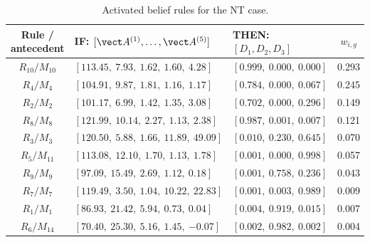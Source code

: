 \begin{table}[!t]
  \centering
  \caption{Activated belief rules for the NT case.}
  \label{tab:ja-if-then-rules}
  \scriptsize
  \setlength{\tabcolsep}{2.0pt}
  \renewcommand{\arraystretch}{1.10}
  \begin{tabularx}{\columnwidth}{@{}c>{\centering\arraybackslash}Xlc@{}}
    \toprule
    Rule / antecedent & IF: $[\vect A^{(1)},\ldots,\vect A^{(5)}]$ & THEN: $[D_1,D_2,D_3]$ & $w_{i,g}$ \\
    \midrule
    $R_{10}/M_{10}$ & $[113.45,\ 7.93,\ 1.62,\ 1.60,\ 4.28]$  & $[0.999,\ 0.000,\ 0.000]$ & 0.293 \\
    $R_{4}/M_{4}$   & $[104.91,\ 9.87,\ 1.81,\ 1.16,\ 1.17]$  & $[0.784,\ 0.000,\ 0.067]$ & 0.245 \\
    $R_{2}/M_{2}$   & $[101.17,\ 6.99,\ 1.42,\ 1.35,\ 3.08]$  & $[0.702,\ 0.000,\ 0.296]$ & 0.149 \\
    $R_{8}/M_{8}$   & $[121.99,\ 10.14,\ 2.27,\ 1.13,\ 2.38]$ & $[0.987,\ 0.001,\ 0.007]$ & 0.121 \\
    $R_{3}/M_{3}$   & $[120.50,\ 5.88,\ 1.66,\ 11.89,\ 49.09]$ & $[0.010,\ 0.230,\ 0.645]$ & 0.070 \\
    $R_{5}/M_{11}$  & $[113.08,\ 12.10,\ 1.70,\ 1.13,\ 1.78]$ & $[0.001,\ 0.000,\ 0.998]$ & 0.057 \\
    $R_{9}/M_{9}$   & $[97.09,\ 15.49,\ 2.69,\ 1.12,\ 0.18]$  & $[0.001,\ 0.758,\ 0.236]$ & 0.043 \\
    $R_{7}/M_{7}$   & $[119.49,\ 3.50,\ 1.04,\ 10.22,\ 22.83]$ & $[0.001,\ 0.003,\ 0.989]$ & 0.009 \\
    $R_{1}/M_{1}$   & $[86.93,\ 21.42,\ 5.94,\ 0.73,\ 0.04]$  & $[0.004,\ 0.919,\ 0.015]$ & 0.007 \\
    $R_{6}/M_{14}$  & $[70.40,\ 25.30,\ 5.16,\ 1.45,\ {-0.07}]$ & $[0.002,\ 0.982,\ 0.002]$ & 0.004 \\
    \bottomrule
  \end{tabularx}
\end{table}
